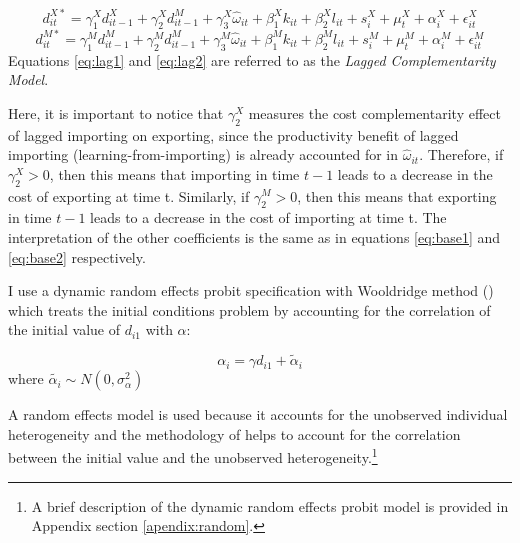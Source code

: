 \documentclass[12pt]{article}
\begin{document}
\begin{equation}
\label{eq:lag1}
d_{it}^{X*}=   \gamma_{1}^{X} d_{it-1}^{X} + \gamma_{2}^{X} d_{it-1}^{M}+
\gamma_{3}^{X} \hat{\omega}_{it}  + \beta_{1}^{X}k_{it}  +\beta_{2}^{X}l_{it}+
s_{i}^{X} + \mu_{t}^{X}  + \alpha_{i}^{X}+ \epsilon_{it}^{X}
\end{equation}
\begin{equation}
\label{eq:lag2}
d_{it}^{M*}=   \gamma_{1}^{M} d_{it-1}^{M} + \gamma_{2}^{M} d_{it-1}^{M}+
\gamma_{3}^{M} \hat{\omega}_{it}  + \beta_{1}^{M}k_{it}  +\beta_{2}^{M}l_{it}+
s_{i}^{M} + \mu_{t}^{M}  + \alpha_{i}^{M}+ \epsilon_{it}^{M}
\end{equation}
Equations \ref{eq:lag1} and \ref{eq:lag2} are referred to as the
\textit{Lagged Complementarity Model}. 

Here, it is important to notice that  $\gamma_{2}^{X}$ measures the
cost complementarity effect of lagged importing on
exporting, since the productivity benefit of lagged importing
(learning-from-importing) is already
accounted for in $\hat{\omega}_{it}$. Therefore, if $\gamma_{2}^{X}>0$, then this means that
importing in time $t-1$ leads to a decrease in the cost of exporting at time t.  
Similarly, if  $\gamma_{2}^{M}>0$, then this means that
exporting in time $t-1$ leads to a decrease in the cost of importing at time
t. The interpretation of the other coefficients is the same as in
equations \ref{eq:base1} and \ref{eq:base2} respectively. 
  
I use a dynamic random effects probit specification with Wooldridge
method (\textcite{wooldridge2005simple}) which treats the initial conditions problem by accounting for
the correlation of the initial value of $d_{i1}$ with $\alpha$:


$$  \alpha_{i}= \gamma d_{i1}+ \tilde{\alpha}_{i} $$
where $ \tilde{\alpha_{i}} \sim N(0, \sigma_{\alpha}^{2}) $

A random effects model is used because it accounts for the unobserved
individual heterogeneity and the methodology of
\textcite{wooldridge2005simple} helps to account for the correlation
between the initial value and the unobserved heterogeneity.\footnote{A
  brief description of the dynamic random effects probit model is
  provided in Appendix section \ref{apendix:random}.}
 
\end{document}
